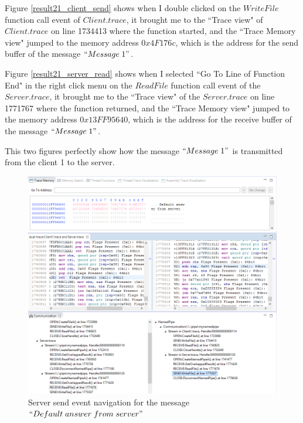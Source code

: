 Figure \ref{result21_client_send} shows when I double clicked on the $WriteFile$ function call event of $Client.trace$, it brought me to the ``Trace view" of $Client.trace$ on line 1734413 where the function started, and the ``Trace Memory view" jumped to the memory address $0x4F176c$, which is the address for the send buffer of the message $``Message\; 1"$.

Figure \ref{result21_server_read} shows when I selected ``Go To Line of Function End" in the right click menu on the $ReadFile$ function call event of the $Server.trace$, it brought me to the ``Trace view" of the $Server.trace$ on line 1771767 where the function returned, and the ``Trace Memory view" jumped to the memory address $0x13FF95640$, which is the address for the receive buffer of the message $``Message\; 1"$.

This two figures perfectly show how the message $``Message\; 1"$ is transmitted from the client 1 to the server.

\begin{figure}
\includegraphics[width=\textwidth]{Figures/result21_server_send}
 \caption{Server send event navigation for the message $``Default\; answer\; from\; server"$}
\label{result21_server_send}
\end{figure}

